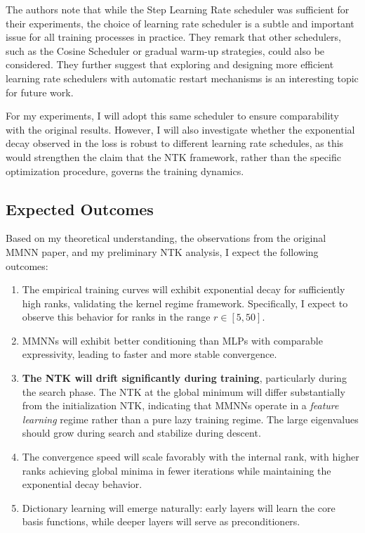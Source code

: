 \documentclass[12pt]{article}
\begin{document}
The authors note that while the Step Learning Rate scheduler was sufficient for their experiments, the choice of learning rate scheduler is a subtle and important issue for all training processes in practice. They remark that other schedulers, such as the Cosine Scheduler or gradual warm-up strategies, could also be considered. They further suggest that exploring and designing more efficient learning rate schedulers with automatic restart mechanisms is an interesting topic for future work.

For my experiments, I will adopt this same scheduler to ensure comparability with the original results. However, I will also investigate whether the exponential decay observed in the loss is robust to different learning rate schedules, as this would strengthen the claim that the NTK framework, rather than the specific optimization procedure, governs the training dynamics.

\subsection{Expected Outcomes}

Based on my theoretical understanding, the observations from the original MMNN paper, and my preliminary NTK analysis, I expect the following outcomes:

\begin{enumerate}
    \item The empirical training curves will exhibit exponential decay for sufficiently high ranks, validating the kernel regime framework. Specifically, I expect to observe this behavior for ranks in the range $r \in [5, 50]$.
    \item MMNNs will exhibit better conditioning than MLPs with comparable expressivity, leading to faster and more stable convergence.
    \item \textbf{The NTK will drift significantly during training}, particularly during the search phase. The NTK at the global minimum will differ substantially from the initialization NTK, indicating that MMNNs operate in a \emph{feature learning} regime rather than a pure lazy training regime. The large eigenvalues should grow during search and stabilize during descent.
    \item The convergence speed will scale favorably with the internal rank, with higher ranks achieving global minima in fewer iterations while maintaining the exponential decay behavior.
    \item Dictionary learning will emerge naturally: early layers will learn the core basis functions, while deeper layers will serve as preconditioners.
\end{enumerate}
\end{document}
